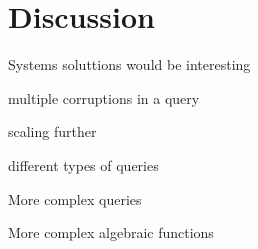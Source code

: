 \section{Discussion}

Systems soluttions would be interesting

multiple corruptions in a query

scaling further

different types of queries

More complex queries

More complex algebraic functions



